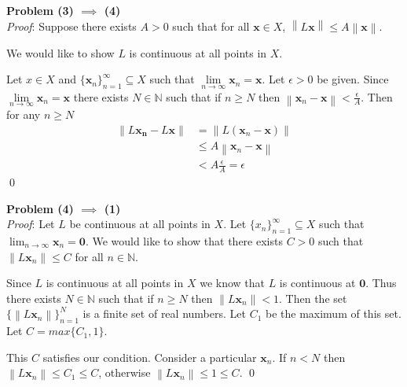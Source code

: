 \documentclass[12pt]{article}
\newcommand{\problem}[1]{\hspace{-4 ex} \large \textbf{Problem #1} }
\newcommand{\norm}[1]{\left\lVert#1\right\rVert}
\renewenvironment{proof}{\hspace{-4 ex} \emph{Proof}:}{\qed}
\newcommand{\NN}{\mathbb{N}}
\renewcommand{\vec}[1]{\boldsymbol{#1}}
\begin{document}
\problem{(3) $\implies$ (4)} \\
\begin{proof}
	Suppose there exists $A>0$ such that for all $\vec{x} \in X$, $\norm{L\vec{x}} \leq A \norm{\vec{x}}$. \bigbreak
	
	We would like to show $L$ is continuous at all points in $X$. \bigbreak
	
	Let $x \in X$ and $\{\vec{x}_n\}_{n=1}^\infty \subseteq X$ such that $\lim\limits_{n\to \infty} \vec{x}_n = \vec{x}$. Let $\epsilon >0$ be given. Since $\lim\limits_{n\to \infty} \vec{x}_n = \vec{x}$ there exists $N \in \NN$ such that if $n\geq N$ then $\norm{\vec{x}_n - \vec{x}} < \frac{\epsilon}{A}$. Then for any $n \geq N$
	\begin{align*}
		\norm{L \vec{x_n} - L\vec{x}} & = \norm{L(\vec{x}_n - \vec{x})} \\
		& \leq A \norm{\vec{x}_n - \vec{x}} \\
		& < A \frac{\epsilon}{A} = \epsilon
	\end{align*}
\end{proof}



\problem{(4) $\implies$ (1)} \\
\begin{proof}
	Let $L$ be continuous at all points in $X$. Let $\{x_n\}_{n=1}^\infty \subseteq X$ such that $\lim_{n \to \infty} \vec{x}_n = \vec{0}$. We would like to show that there exists $C>0$ such that $\norm{L\vec{x}_n} \leq C$ for all $n \in \NN$. \bigbreak
	
	Since $L$ is continuous at all points in $X$ we know that $L$ is continuous at $\vec{0}$. Thus there exists $N \in \NN$ such that if $n \geq N$ then $\norm{L\vec{x}_n} < 1$. Then the set $\{\norm{L\vec{x}_n} \}_{n=1}^N$ is a finite set of real numbers. Let $C_1$ be the maximum of this set. Let $C = max\{C_1, 1\}$. \bigbreak
	
	This $C$ satisfies our condition. Consider a particular $\vec{x}_n$. If $n<N$ then $\norm{L\vec{x}_n} \leq C_1 \leq C$, otherwise $\norm{L\vec{x}_n} \leq 1 \leq C$.
\end{proof}
\end{document}
